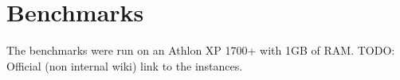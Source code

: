 \documentclass[a4paper,10pt]{article}
\begin{document}
\section{Benchmarks}
The benchmarks were run on an Athlon XP 1700+ with 1GB of RAM.
TODO: Official (non internal wiki) link to the instances.


\appendixname
\begin{appendix}
\label{appendix}

\end{appendix}



\appendix
\end{document}
